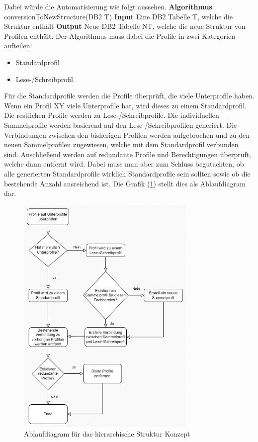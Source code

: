 Dabei würde die Automatisierung wie folgt aussehen.
\newline
\newline
\textbf{Algorithmus} conversionToNewStructure(DB$2$ T)
\newline
\newline
\textbf{Input} Eine DB2 Tabelle T, welche die Struktur enthält
\newline
\newline
\textbf{Output} Neue DB2 Tabelle NT, welche die neue Struktur von Profilen enthält.
\newline
\newline
Der Algorithmus muss dabei die Profile in zwei Kategorien aufteilen:
\begin{itemize}
	\item Standardprofil
	\item Lese-/Schreibprofil
\end{itemize}
Für die Standardprofile werden die Profile überprüft, die viele Unterprofile haben.
Wenn ein Profil XY viele Unterprofile hat, wird dieses zu einem Standardprofil.
Die restlichen Profile werden zu Lese-/Schreibprofile.
Die individuellen Sammelprofile werden basierend auf den Lese-/Schreibprofilen generiert.
Die Verbindungen zwischen den bisherigen Profilen werden aufgebrochen und zu den neuen Sammelprofilen zugewiesen, welche mit dem Standardprofil verbunden sind.
Anschließend werden auf redundante Profile und Berechtigungen überprüft, welche dann entfernt wird.
Dabei muss man aber zum Schluss begutachten, ob alle generierten Standardprofile wirklich Standardprofile sein sollten sowie ob die bestehende Anzahl ausreichend ist.
Die Grafik (\ref{fig:Hier}) stellt dies als Ablaufdiagram dar.
\begin{figure}[h!]
 \centering
 \includegraphics[width=0.77\textwidth]{gfx/Picture/Hier.PNG}
 \caption{Ablaufdiagram für das hierarchische Struktur Konzept}
 \label{fig:Hier}
\end{figure}
\newpage


